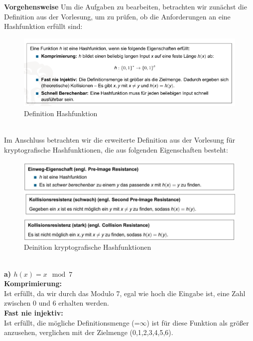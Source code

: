 \documentclass[german]{../uebung}
\begin{document}
\begin{exercise}{1}
    \textbf{Vorgehensweise}
    Um die Aufgaben zu bearbeiten, betrachten wir zunächst die Definition aus der Vorlesung, um zu prüfen, ob die Anforderungen an eine Hashfunktion erfüllt sind:\\
    \begin{figure}[h]
        \centering
        \includegraphics*[scale=.5]{Definition Hashfunktion.png}
        \caption{Definition Hashfunktion}
    \end{figure}\\
    Im Anschluss betrachten wir die erweiterte Definition aus der Vorlesung für kryptografische Hashfunktionen, die aus folgenden Eigenschaften besteht:\\
    \begin{figure}[h]
        \centering
        \includegraphics*[scale=.5]{kryptoEIgenschaftenKompakt.png}
        \caption{Deinition kryptografische Hashfunktionen}
    \end{figure}\\
    \textbf{a) \(h(x) = x \mod 7\)}\\
    \textbf{Komprimierung:}\\
    Ist erfüllt, da wir durch das Modulo 7, egal wie hoch die Eingabe ist, eine Zahl zwischen 0 und 6 erhalten werden.\\
    \textbf{Fast nie injektiv:}\\
    Ist erfüllt, die mögliche Definitionsmenge (=\(\infty\)) ist für diese Funktion als größer anzusehen, verglichen mit der Zielmenge (0,1,2,3,4,5,6).\\

\end{exercise}
\end{document}
